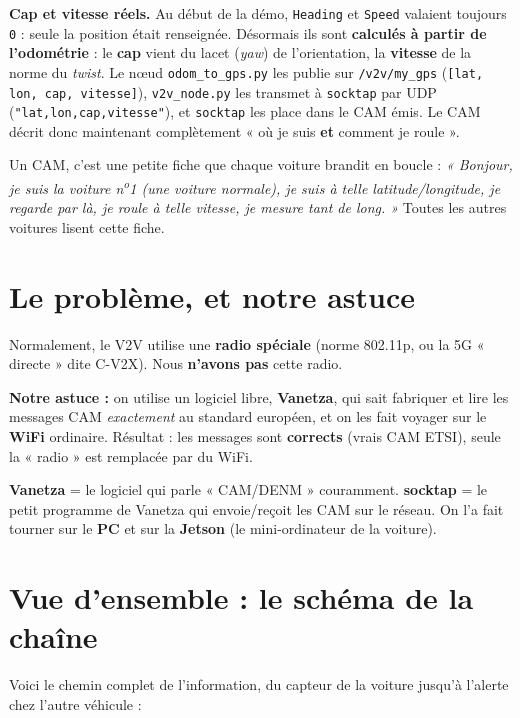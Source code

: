 \documentclass[a4paper,11pt]{article}
\begin{document}
\begin{info}
\textbf{Cap et vitesse réels.} Au début de la démo, \texttt{Heading} et
\texttt{Speed} valaient toujours \texttt{0} : seule la position était renseignée.
Désormais ils sont \textbf{calculés à partir de l'odométrie} : le \textbf{cap}
vient du lacet (\emph{yaw}) de l'orientation, la \textbf{vitesse} de la norme du
\emph{twist}. Le nœud \texttt{odom\_to\_gps.py} les publie sur \texttt{/v2v/my\_gps}
(\texttt{[lat, lon, cap, vitesse]}), \texttt{v2v\_node.py} les transmet à
\texttt{socktap} par UDP (\texttt{"lat,lon,cap,vitesse"}), et \texttt{socktap}
les place dans le CAM émis. Le CAM décrit donc maintenant complètement
« où je suis \textbf{et} comment je roule ».
\end{info}

\begin{analogie}
Un CAM, c'est une petite fiche que chaque voiture brandit en boucle :
\emph{« Bonjour, je suis la voiture n\textsuperscript{o}1 (une voiture normale),
je suis à telle latitude/longitude, je regarde par là, je roule à telle vitesse,
je mesure tant de long. »} Toutes les autres voitures lisent cette fiche.
\end{analogie}

\section{Le problème, et notre astuce}
Normalement, le V2V utilise une \textbf{radio spéciale} (norme 802.11p, ou la
5G « directe » dite C-V2X). Nous \textbf{n'avons pas} cette radio.

\textbf{Notre astuce :} on utilise un logiciel libre, \textbf{Vanetza}, qui sait
fabriquer et lire les messages CAM \emph{exactement} au standard européen, et on
les fait voyager sur le \textbf{WiFi} ordinaire. Résultat : les messages sont
\textbf{corrects} (vrais CAM ETSI), seule la « radio » est remplacée par du WiFi.

\begin{cle}
\textbf{Vanetza} = le logiciel qui parle « CAM/DENM » couramment.
\textbf{socktap} = le petit programme de Vanetza qui envoie/reçoit les CAM sur le
réseau. On l'a fait tourner sur le \textbf{PC} et sur la \textbf{Jetson} (le
mini-ordinateur de la voiture).
\end{cle}

\section{Vue d'ensemble : le schéma de la chaîne}
Voici le chemin complet de l'information, du capteur de la voiture jusqu'à
l'alerte chez l'autre véhicule :
\end{document}
